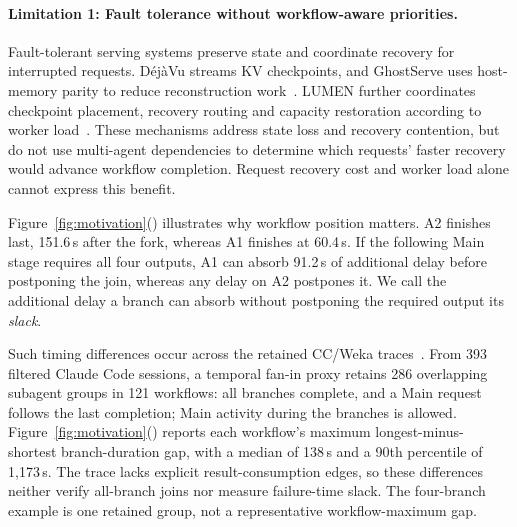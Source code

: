 \paragraph{Limitation 1: Fault tolerance without workflow-aware priorities.}
Fault-tolerant serving systems preserve state and coordinate recovery
for interrupted requests. D\'ej\`aVu streams KV checkpoints, and GhostServe
uses host-memory parity to reduce reconstruction
work~\cite{strati2024dejavu,jayakody2026ghostserve}.
LUMEN further coordinates checkpoint placement, recovery routing and
capacity restoration according to worker load~\cite{cao2026lumen}.
These mechanisms address state loss and recovery contention, but do not
use multi-agent dependencies to determine which requests' faster
recovery would advance workflow completion. Request recovery cost and
worker load alone cannot express this benefit.

\label{sec:motivation-workflow}
Figure~\ref{fig:motivation}() illustrates
why workflow position matters. A2 finishes last, 151.6\,s after the fork,
whereas A1 finishes at 60.4\,s. If the following Main stage requires all
four outputs, A1 can absorb 91.2\,s of additional delay before postponing
the join, whereas any delay on A2 postpones it. We call the additional
delay a branch can absorb without postponing the required output its
\emph{slack}.

Such timing differences occur across the retained CC/Weka
traces~\cite{semianalysis2026cctraces}. From 393 filtered Claude Code
sessions, a temporal fan-in proxy retains 286 overlapping subagent
groups in 121 workflows: all branches complete, and a Main request
follows the last completion; Main activity during the branches is allowed.
Figure~\ref{fig:motivation}() reports
each workflow's maximum longest-minus-shortest branch-duration gap,
with a median of 138\,s and a 90th percentile of 1,173\,s.
The trace lacks explicit result-consumption edges, so these differences
neither verify all-branch joins nor measure failure-time slack.
The four-branch example is one retained group, not a representative
workflow-maximum gap.

